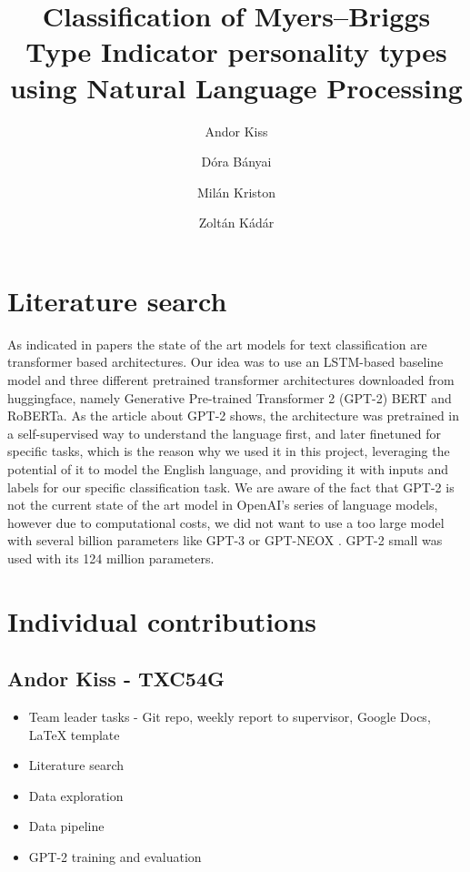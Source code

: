 \documentclass[runningheads]{llncs}
\begin{document}
%
\title{Classification of Myers–Briggs Type Indicator personality types using Natural Language Processing}
%
%
\author{Andor Kiss \and
Dóra Bányai \and
Milán Kriston \and
Zoltán Kádár}
%


\maketitle
\section{Literature search}

As indicated in papers \cite{DL_text_class} \cite{MBTI_class} the state of the art models for text classification are transformer based architectures. Our idea was to use an LSTM-based baseline model and three different pretrained transformer architectures downloaded from huggingface, namely Generative Pre-trained Transformer 2 (GPT-2) \cite{gpt2} BERT and RoBERTa. As the article about GPT-2 \cite{gpt2} shows, the architecture was pretrained in a self-supervised way to understand the language first, and later finetuned for specific tasks, which is the reason why we used it in this project, leveraging the potential of it to model the English language, and providing it with inputs and labels for our specific classification task. We are aware of the fact that GPT-2 is not the current state of the art model in OpenAI's series of language models, however due to computational costs, we did not want to use a too large model with several billion parameters like GPT-3 \cite{gpt-3} or GPT-NEOX \cite{gpt-neox}. GPT-2 small was used with its 124 million parameters.

\section{Individual contributions}

\subsection{Andor Kiss - TXC54G}

\begin{itemize}
  \item Team leader tasks - Git repo, weekly report to supervisor, Google Docs, LaTeX template
  \item Literature search
  \item Data exploration
  \item Data pipeline
  \item GPT-2 training and evaluation
\end{itemize}
\end{document}
